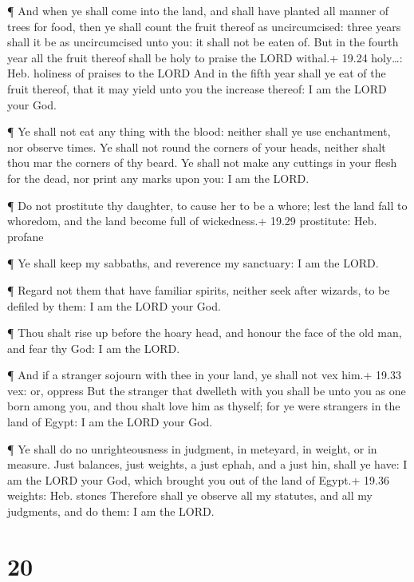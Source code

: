  ¶ And when ye shall come into the land, and shall have
planted all manner of trees for food, then ye shall count the fruit
thereof as uncircumcised: three years shall it be as uncircumcised unto
you: it shall not be eaten of.  But in the fourth year all
the fruit thereof shall be holy to praise the LORD withal.+ 19.24
holy\ldots: Heb. holiness of praises to the LORD  And in
the fifth year shall ye eat of the fruit thereof, that it may yield unto
you the increase thereof: I am the LORD your God.

 ¶ Ye shall not eat any thing with the blood: neither shall
ye use enchantment, nor observe times.  Ye shall not round
the corners of your heads, neither shalt thou mar the corners of thy
beard.  Ye shall not make any cuttings in your flesh for
the dead, nor print any marks upon you: I am the LORD.

 ¶ Do not prostitute thy daughter, to cause her to be a
whore; lest the land fall to whoredom, and the land become full of
wickedness.+ 19.29 prostitute: Heb. profane

 ¶ Ye shall keep my sabbaths, and reverence my sanctuary: I
am the LORD.

 ¶ Regard not them that have familiar spirits, neither seek
after wizards, to be defiled by them: I am the LORD your God.

 ¶ Thou shalt rise up before the hoary head, and honour the
face of the old man, and fear thy God: I am the LORD.

 ¶ And if a stranger sojourn with thee in your land, ye
shall not vex him.+ 19.33 vex: or, oppress  But the
stranger that dwelleth with you shall be unto you as one born among you,
and thou shalt love him as thyself; for ye were strangers in the land of
Egypt: I am the LORD your God.

 ¶ Ye shall do no unrighteousness in judgment, in meteyard,
in weight, or in measure.  Just balances, just weights, a
just ephah, and a just hin, shall ye have: I am the LORD your God, which
brought you out of the land of Egypt.+ 19.36 weights: Heb. stones
 Therefore shall ye observe all my statutes, and all my
judgments, and do them: I am the LORD.

\hypertarget{section-19}{%
\section{20}\label{section-19}}

